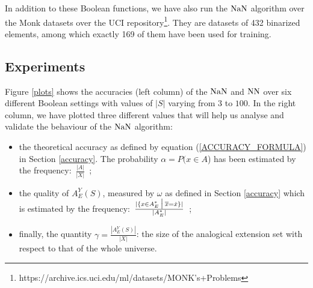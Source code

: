 {In addition to these Boolean functions, we have also run the $\NaN$ algorithm
over the Monk datasets over the UCI
repository\footnote{https://archive.ics.uci.edu/ml/datasets/MONK's+Problems}.
They are datasets of 432 binarized elements, among which exactly 169 of them
have been used for training.

\subsection{Experiments}

Figure \ref{plots} shows the accuracies (left column) of the $\NaN$ and $\NN$
over six different Boolean settings with values of $|S|$ varying from $3$ to
$100$. In the right column, we have plotted three different values that will
help us analyse and validate the behaviour of the
$\NaN$ algorithm:
\begin{itemize}
  \item the theoretical accuracy as defined by equation
    (\ref{ACCURACY_FORMULA})
    in Section \ref{accuracy}. The probability $\alpha = P(x \in A$) has been
    estimated by the frequency:~$\frac{|A|}{|X|}$~;
  \item the quality of $A_E^Y(S)$, measured by $\omega$ as defined in Section
    \ref{accuracy} which is estimated by the frequency:~$\frac{|\{x \in A_E^*
    \given[\big] \albl{x} = \dot{x}\}|}{|A_E^*|}$~;
\item finally, the
    quantity $\gamma = \frac{|A_E^Y(S)|}{|X|}$: the size of
    the analogical extension set with respect to that of the whole universe.
\end{itemize}

}
